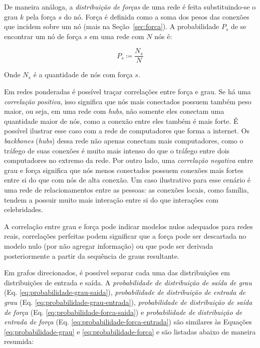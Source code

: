 \documentclass[12pt,a4paper,final]{article}
\newcommand{\defn}{\coloneqq} %
\begin{document}
De maneira análoga, a \textit{distribuição de forças} de uma rede é feita substituindo-se o grau $k$ pela força $s$ do nó. Força é definida como a soma dos pesos das conexões que incidem sobre um nó (mais na Seção~\ref{sec:forca}). A probabilidade $P_s$ de se encontrar um nó de força $s$ em uma rede com $N$ nós é:

\begin{equation} \label{eq:probabilidade-forca}
P_s \defn \frac{N_s}{N}
\end{equation}

Onde $N_s$ é a quantidade de nós com força $s$.

Em redes ponderadas é possível traçar correlações entre força e grau. Se há uma \textit{correlação positiva}, isso significa que nós mais conectados possuem também peso maior, ou seja, em uma rede com \textit{hubs}, não somente eles conectam uma quantidade maior de nós, como a conexão entre eles também é mais forte. É possível ilustrar esse caso com a rede de computadores que forma a internet. Os \textit{backbones} (\textit{hubs}) dessa rede não apenas conectam mais computadores, como o tráfego de suas conexões é muito mais intenso do que o tráfego entre dois computadores no extremo da rede. Por outro lado, uma \textit{correlação negativa} entre grau e força significa que nós menos conectados possuem conexões mais fortes entre si do que com nós de alta conexão. Um caso ilustrativo para esse cenário é uma rede de relacionamentos entre as pessoas: as conexões locais, como família, tendem a possuir muito mais interação entre si do que interações com celebridades.

A correlação entre grau e força pode indicar modelos nulos adequados para redes reais, correlações perfeitas podem significar que a força pode ser descartada no modelo nulo (por não agregar informação) ou que pode ser derivada posteriormente a partir da sequência de graus resultante.

Em grafos direcionados, é possível separar cada uma das distribuições em distribuições de entrada e saída. A \textit{probabilidade de distribuição de saída de grau} (Eq. \ref{eq:probabilidade-grau-saida}), \textit{probabilidade de distribuição de entrada de grau} (Eq. \ref{eq:probabilidade-grau-entrada}), \textit{probabilidade de distribuição de saída de força} (Eq. \ref{eq:probabilidade-forca-saida}) e \textit{probabilidade de distribuição de entrada de força} (Eq. \ref{eq:probabilidade-forca-entrada}) são similares às Equações \ref{eq:probabilidade-grau} e \ref{eq:probabilidade-forca} e são listadas abaixo de maneira resumida:
\end{document}
